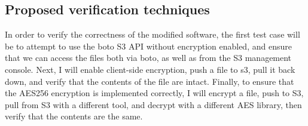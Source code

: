 \subsection{Proposed verification techniques}
In order to verify the correctness of the modified software, the first test case will be to attempt to use the boto S3 API without encryption enabled, and ensure that we can access the files both via boto, as well as from the S3 management console.
Next, I will enable client-side encryption, push a file to s3, pull it back down, and verify that the contents of the file are intact.
Finally, to ensure that the AES256 encryption is implemented correctly, I will encrypt a file, push to S3, pull from S3 with a different tool, and decrypt with a different AES library, then verify that the contents are the same.

